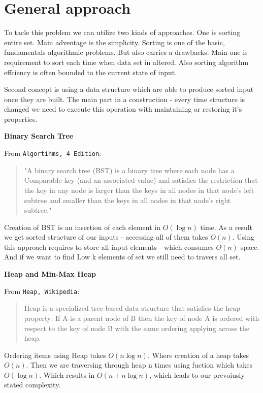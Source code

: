 \section*{General approach}
To tacle this problem we can utilize two kinds of approaches. 
One is sorting entire set. Main adventage is the simplicity. 
Sorting is one of the basic, fundamentals algorithmic problems.
But also carries a drawbacks. Main one is requirement to sort 
each time when data set in altered. 
Also sorting algorithm effciency is often bounded to the current 
state of input. 


Second concept is using a data structure which are able to produce
sorted input once they are built. The main part in a construction
- every time structure is changed we need to execute this operation
with maintaining or restoring it's properties.  
 
\noindent \textbf{Binary Search Tree}

From \texttt{Algortihms, 4 Edition}:
\begin{quote}
"A binary search tree (BST) is a binary tree where each node has a Comparable key 
(and an associated value) and satisfies the restriction that the key in any node is larger than the keys 
in all nodes in that node's left subtree and smaller than the keys in all nodes in that node's right subtree."
\end{quote}

Creation of BST is an insertion of each element in $O(\log{}n)$ time. As a result 
we get sorted structure of our inputs - accessing all of them takes $O(n)$.
Using this approach requires to store all input elements - which consumes $O(n)$ space. 
And if we want to find Low k elements of set we still need to travers all set.

\noindent \textbf{Heap and Min-Max Heap}

From \texttt{Heap, Wikipedia}:
\begin{quote}Heap is a specialized tree-based data structure that satisfies the heap property: 
If A is a parent node of B then the key of node A is ordered with respect to the key of node 
B with the same ordering applying across the heap.
\end{quote}

Ordering items using Heap takes $O(n\log{}n)$. Where creation of a heap takes
$O(n)$. Then we are traversing through heap n times using fuction which takes
$O(\log{}n)$. Which results in $O(n + n\log{}n)$, which leads to our prevoiusly
stated complexity.


